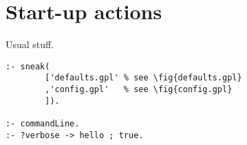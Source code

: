 \section{ Start-up actions
}
Usual stuff.
\begin{Verbatim}
:- sneak(
        ['defaults.gpl' % see \fig{defaults.gpl}
        ,'config.gpl'   % see \fig{config.gpl}
        ]).

:- commandLine.
:- ?verbose -> hello ; true.
\end{Verbatim}
